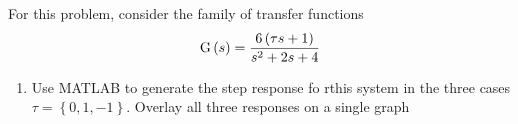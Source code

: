

%
%

\newcommand{\hmwkTitle}{Homework 05}
\newcommand{\hmwkSubTitle}{MATLAB & Transfer Functions}
\newcommand{\hmwkDueDate}{March 7th, 2025}
\newcommand{\hmwkDueTime}{05:00 PM}
\newcommand{\hmwkClass}{ENAE 432 - 0101}
\newcommand{\hmwkClassTime}{09:00}
\newcommand{\hmwkClassInstructor}{Dr. Sanner}
\newcommand{\hmwkAuthorName}{\textbf{Vai Srivastava}}
\newcommand{\hmwkCompletionDate}{\today}



\maketitle

\pagebreak

\begin{hwkProblem}{1}{}

	For this problem, consider the family of transfer functions \[
		\func{G}[s] = \frac{6 \left(\tau s + 1\right)}{s^{2} + 2s + 4}
	\]
	\begin{enumerate}
		\item Use MATLAB to generate the step response fo rthis system in the three cases \( \tau = \left\{0, 1, -1\right\} \). Overlay all three responses on a single graph
	\end{enumerate}

	\hwkSol

	

\end{hwkProblem}


